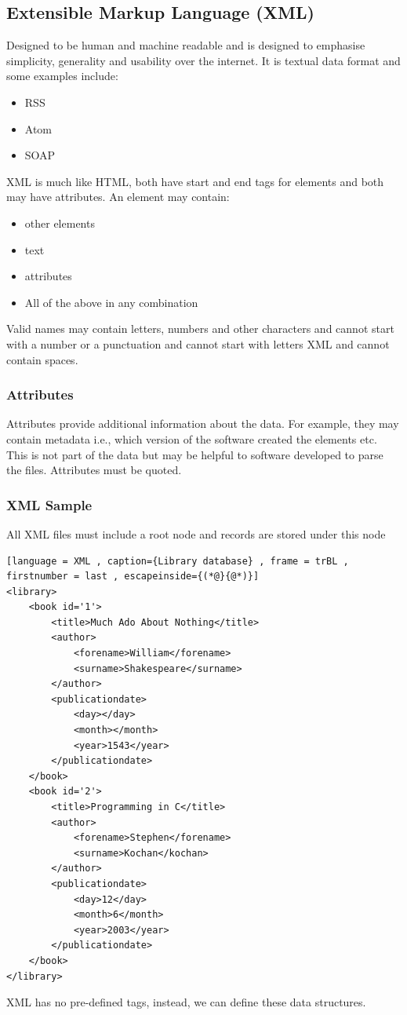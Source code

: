\documentclass[a4paper]{article}
\theoremstyle{plain}
\theoremstyle{definition}
\theoremstyle{remark}
\begin{document}
\begin{flushleft}
\subsection{Extensible Markup Language (XML)}
Designed to be human and machine readable and is designed to emphasise simplicity, generality and usability over the internet. It is textual data format and some examples include:
\begin{itemize}
	\item RSS
	\item Atom
	\item SOAP
\end{itemize}
XML is much like HTML, both have start and end tags for elements and both may have attributes. An element may contain:
\begin{itemize}
	\item other elements
	\item text
	\item attributes
	\item All of the above in any combination
\end{itemize}
Valid names may contain letters, numbers and other characters and cannot start with a number or a punctuation and cannot start with letters XML and cannot contain spaces.
\subsubsection{Attributes}
Attributes provide additional information about the data. For example, they may contain metadata i.e., which version of the software created the elements etc. This is not part of the data but may be helpful to software developed to parse the files. Attributes must be quoted. 
\subsubsection{XML Sample}
All XML files must include a root node and records are stored under this node
\begin{lstlisting}[language = XML , caption={Library database} , frame = trBL , firstnumber = last , escapeinside={(*@}{@*)}]
<library>
	<book id='1'>
		<title>Much Ado About Nothing</title>
		<author>
			<forename>William</forename>
			<surname>Shakespeare</surname>
		</author>
		<publicationdate>
			<day></day>
			<month></month>
			<year>1543</year>
		</publicationdate>
	</book>
	<book id='2'>
		<title>Programming in C</title>
		<author>
			<forename>Stephen</forename>
			<surname>Kochan</kochan>
		</author>
		<publicationdate>
			<day>12</day>
			<month>6</month>
			<year>2003</year>
		</publicationdate>
	</book>
</library>
\end{lstlisting}
XML has no pre-defined tags, instead, we can define these data structures.

\end{flushleft}
\end{document}
